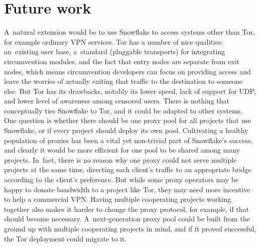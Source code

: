 \documentclass[letterpaper,twocolumn]{article}
\begin{document}

\section{Future work}
\label{sec:future}

A~natural extension would be to use Snowflake
to access systems other than Tor,
for example ordinary VPN services.
Tor has a number of nice qualities:
an~existing user base,
a~standard (pluggable transports) for integrating
circumvention modules,
and the fact that entry nodes are separate from exit nodes,
which means circumvention developers can focus on providing access
and leave the worries of actually exiting that traffic
to the destination to someone else.
But Tor has its drawbacks,
notably its lower speed,
lack of support for UDP,
and lower level of awareness among censored users.
There is nothing that conceptually ties Snowflake to Tor,
and it could be adapted to other systems.
One question is whether there should be one proxy pool
for all projects that use Snowflake,
or if every project should deploy its own pool.
Cultivating a healthy population of proxies
has been a vital yet non-trivial part of Snowflake's success,
and clearly it would be more efficient for one pool
to be shared among many projects.
In~fact, there is no reason why one proxy could not
serve multiple projects at the same time,
directing each client's traffic to an appropriate bridge
according to the client's preference.
But while some proxy operators may be happy to donate
bandwidth to a project like Tor,
they may need more incentive to help a commercial VPN.
Having multiple cooperating projects
working together also makes it harder
to change the proxy protocol, for example,
if that should become necessary.
A~next-generation proxy pool could be built
from the ground up with multiple cooperating projects in mind,
and if it proved successful,
the Tor deployment could migrate to it.
\end{document}
